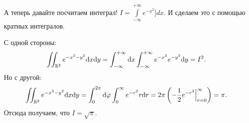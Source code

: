 \begin{Examples}
А теперь давайте посчитаем интеграл! $I = \int\limits_{-\infty}^{+\infty} e^{-x^2}]dx$. И сделаем это с помощью кратных интегралов.

С одной стороны:
$$
\iint_{\mathbb{R}^2} e^{-x^2 -y^2}\mathrm{d}x \mathrm{d} y = \int_{-\infty}^{+\infty}\mathrm{d}x \int_{-\infty}^{+\infty} e^{-x^2}e^{-y^2}\mathrm{d} y = I^2.
$$
Но с другой:
$$
\iint_{\mathbb{R}^2} e^{-x^2 -y^2}\mathrm{d}x \mathrm{d} y = \int_0^{2\pi}\mathrm{d} \varphi \int_0^\infty e^{-r^2}r\mathrm{d} r = 2\pi\left( -\dfrac{1}{2} e^{-r^2} \Big|_{r=0}^\infty \right) = \pi.
$$
Отсюда получаем, что $I = \sqrt{\pi}$.
\end{Examples}














